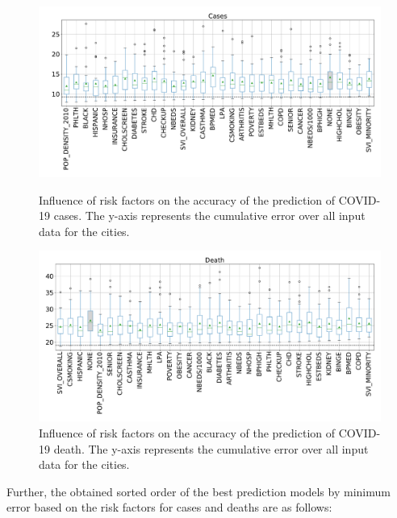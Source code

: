 \documentclass[a4paper, inpress]{jds} %
\renewcommand{\_}{%
    \textunderscore\hspace{0pt}%
}
\begin{document}
\begin{figure}[!p]
    \centering
    \includegraphics[width=1.0\textwidth]{images/boxwhisker/boxplot_casesNEW2.pdf}
    \vspace{-1cm}
    \caption{Influence of risk factors on the accuracy of the
      prediction of COVID-19 cases. The y-axis represents the
      cumulative error over all input data for the cities.}
    \label{fig:box-cases}
    \bigskip

    \includegraphics[width=1.0\textwidth]{images/boxwhisker/boxplot_deathNEW2.pdf}
    \vspace{-1cm}
    \caption{Influence of risk factors on the accuracy of the
      prediction of COVID-19 death. The y-axis represents the
      cumulative error over all input data for the cities.}
    \label{fig:box-death}
\end{figure}



Further, the obtained sorted order of the best prediction models by
minimum error based on the risk factors for cases and deaths are as
follows:
\end{document}
